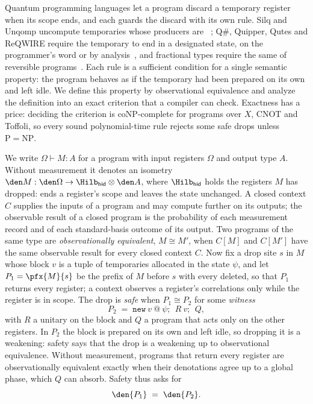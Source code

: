 Quantum programming languages let a program discard a temporary register when its scope ends, and each guards
the discard with its own rule. Silq and Unqomp uncompute temporaries whose producers are
~\cite{Bichsel2020Silq,Paradis2021Unqomp}; Q\#, Quipper, Qutes and ReQWIRE require the temporary to
end in a designated state, on the programmer's word or by
analysis~\cite{Svore2018Qsharp,MicrosoftQsharpMemory,Green2013Quipper,Faro2026Qutes,Rand2019ReQWIRE}, and
fractional types require the same of reversible programs~\cite{Chen2020Fractional}. Each rule is a sufficient
condition for a single semantic property: the program behaves as if the temporary had been prepared on its own
and left idle. We define this property by observational equivalence and analyze the definition into an exact
criterion that a compiler can check. Exactness has a price: deciding the criterion is coNP-complete for programs
over $X$, CNOT and Toffoli, so every sound polynomial-time rule rejects some safe drops unless
$\mathrm P=\mathrm{NP}$.

We write $\Omega\vdash M:A$ for a program with input registers $\Omega$ and output type $A$. Without measurement
it denotes an isometry $\den M:\den\Omega\to\Hilb_{\mathsf{hid}}\otimes\den A$, where $\Hilb_{\mathsf{hid}}$ holds
the registers $M$ has dropped: \drop{} ends a register's scope and leaves the state unchanged. A closed context
$C$ supplies the inputs of a program and may compute further on its outputs; the observable result of a closed
program is the probability of each measurement record and of each standard-basis outcome of its output. Two
programs of the same type are \emph{observationally equivalent}, $M\cong M'$, when $C[M]$ and $C[M']$ have the same
observable result for every closed context $C$. Now fix a drop site $s$ in $M$ whose block $v$ is a tuple of
temporaries allocated in the state $\psi$, and let $P_1=\pfx{M}{s}$ be the prefix of $M$ before $s$ with every
\drop{} deleted, so that $P_1$ returns every register; a context observes a register's correlations only while
the register is in scope. The drop is \emph{safe} when $P_1\cong P_2$ for some \emph{witness}
\[
  P_2\;=\;\mathtt{new}\ v\ \mathtt{@}\ \psi\mathtt{;}\ \ R\ v\mathtt{;}\ \ Q,
\]
with $R$ a unitary on the block and $Q$ a program that acts only on the other registers. In $P_2$ the block
is prepared on its own and left idle, so dropping it is a weakening: safety says that the drop is a weakening up
to observational equivalence. Without measurement, programs that return every register are observationally
equivalent exactly when their denotations agree up to a global phase, which $Q$ can absorb. Safety thus asks for
\[
  \den{P_1}\;=\;\den{P_2}.
\]

